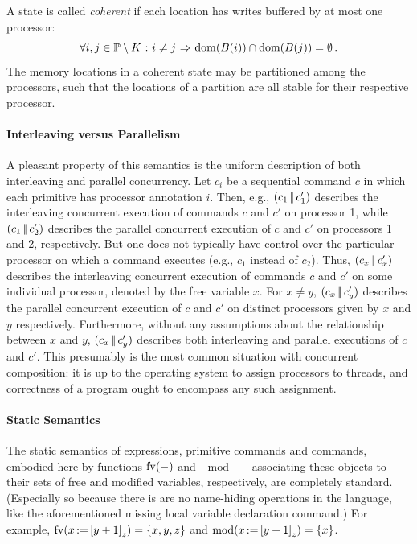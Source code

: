 \documentclass[11pt]{report}         %
\begin{document}
A state is called \emph{coherent} if each location has writes buffered by at most one processor: \[ \forall i,j \in \mathbb{P} \setminus K \operatorname{\,:\,} i \neq j \operatorname{\,\Rightarrow\,} \operatorname{\mathrm{dom}}(B(i)) \cap \operatorname{\mathrm{dom}}(B(j)) = \operatorname{\emptyset}.\] The memory locations in a coherent state may be partitioned among the processors, such that the locations of a partition are all stable for their respective processor.

\paragraph{Interleaving versus Parallelism} A pleasant property of this semantics is the uniform description of both interleaving and parallel concurrency. Let $c_i$ be a sequential command $c$ in which each primitive has processor annotation $i$. Then, e.g., $(c_1 \operatorname{|\!|} c'_1)$ describes the interleaving concurrent execution of commands $c$ and $c'$ on processor 1, while $(c_1 \operatorname{|\!|} c'_2)$ describes the parallel concurrent execution of $c$ and $c'$ on processors 1 and 2, respectively. But one does not typically have control over the particular processor on which a command executes (e.g., $c_1$ instead of $c_2$). Thus, $(c_x \operatorname{|\!|} c'_x)$ describes the interleaving concurrent execution of commands $c$ and $c'$ on some individual processor, denoted by the free variable $x$. For $x \neq y$, $(c_x \operatorname{|\!|} c'_y)$ describes the parallel concurrent execution of $c$ and $c'$ on distinct processors given by $x$ and $y$ respectively. Furthermore, without any assumptions about the relationship between $x$ and $y$, $(c_x \operatorname{|\!|} c'_y)$ describes both interleaving and parallel executions of $c$ and $c'$. This presumably is the most common situation with concurrent composition: it is up to the operating system to assign processors to threads, and correctness of a program ought to encompass any such assignment.

\paragraph{Static Semantics} The static semantics of expressions, primitive commands and commands, embodied here by functions $\mathrm{fv}(-)$ and $\mod{-}$ associating these objects to their sets of free and modified variables, respectively, are completely standard. (Especially so because there is are no name-hiding operations in the language, like the aforementioned missing local variable declaration command.) For example, $\mathrm{fv}(x \operatorname{:\!=} \left[ y+1 \right]_z) = \left\lbrace x,y,z \right\rbrace$ and $\mathrm{mod}(x \operatorname{:\!=} \left[ y+1 \right]_z) = \left\lbrace x \right\rbrace$.  
\end{document}
